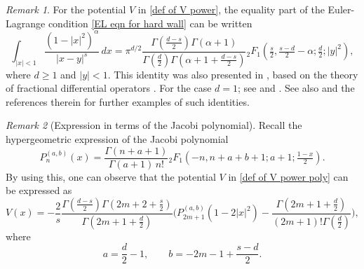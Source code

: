 \documentclass[10pt]{amsart}
\theoremstyle{plain}
\theoremstyle{remark}
\newtheorem{rem}{Remark}
\numberwithin{equation}{section}
\begin{document}
\begin{rem}
For the potential $V$ in \eqref{def of V power}, the equality part of the Euler-Lagrange condition \eqref{EL eqn for hard wall} can be written 
\begin{equation}\label{1.34}
\int_{ |x|<1 } \frac{ (1-|x|^2)^{\alpha} }{ |x-y|^s }\,dx =  \pi^{d/2}  \frac{ \Gamma(\frac{d-s}{2}) \Gamma(\alpha+1) }{ \Gamma( \frac{d}{2} ) \Gamma(\alpha+1+\frac{d-s}{2}) }   {}_2F_1(\tfrac{s}{2},\tfrac{s-d}{2}-\alpha;\tfrac{d}{2};|y|^2), 
 \end{equation}
 where $d \ge 1$ and $|y|<1$.
This identity was also presented in \cite[Lemma~2.4]{GCO23}, based on the theory of fractional differential operators \cite[Corollary~4]{DKK17}. For the case $d=1$; see \cite[Eq.(2.3)]{GCO22} and \cite[Eq.(9)]{ADKKMMS19}. See also \cite{GP23} and the references therein for further examples of such identities.
\end{rem}

\begin{rem}[Expression in terms of the Jacobi polynomial]
Recall the hypergeometric expression of the Jacobi polynomial \cite[Eq.(15.9.1)]{NIST}
\begin{equation}
P_n^{ (a,b) }(x) = \frac{ \Gamma(n+a+1) }{ \Gamma(a+1) \,n! } {}_2F_1( -n,n+a+b+1; a+1; \tfrac{1-x}{2} ). 
\end{equation} 
By using this, one can observe that the potential $V$ in \eqref{def of V power poly} can be expressed as   
\begin{equation}
V(x)= - \frac{2}{s}   \frac{   \Gamma(\frac{d-s}{2})  \Gamma(2m+2+\frac{s}{2} ) }{  \Gamma(2m+1+\frac{d}{2}) }    \bigg( P_{ 2m+1 }^{ (a,b) }(1-2|x|^2) - \frac{ \Gamma(2m+1+\frac{d}{2}) }{ (2m+1)! \Gamma( \frac{d}{2} ) }  \bigg),  
\end{equation}
where 
\begin{equation}
 a= \frac{d}{2}-1, \qquad b=-2m-1+\frac{s-d}{2}.
\end{equation}  
\end{rem}
 
\end{document}
